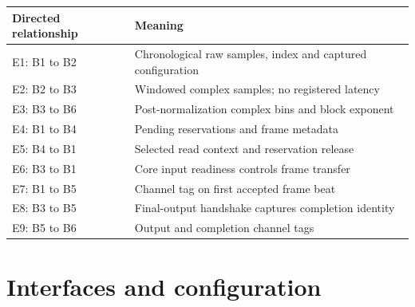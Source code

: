 \documentclass[11pt,a4paper]{article}
\begin{document}
{\small\renewcommand{\arraystretch}{1.18}\begin{longtable}{@{}L{0.24\textwidth}|L{0.7\textwidth}@{}}\toprule

\textbf{Directed relationship} & \textbf{Meaning}\\\midrule\endhead

E1: B1 to B2 & Chronological raw samples,\allowbreak{} index and captured configuration\\[2pt]\hline

E2: B2 to B3 & Windowed complex samples; no registered latency\\[2pt]\hline

E3: B3 to B6 & Post-normalization complex bins and block exponent\\[2pt]\hline

E4: B1 to B4 & Pending reservations and frame metadata\\[2pt]\hline

E5: B4 to B1 & Selected read context and reservation release\\[2pt]\hline

E6: B3 to B1 & Core input readiness controls frame transfer\\[2pt]\hline

E7: B1 to B5 & Channel tag on first accepted frame beat\\[2pt]\hline

E8: B3 to B5 & Final-output handshake captures completion identity\\[2pt]\hline

E9: B5 to B6 & Output and completion channel tags\\[2pt]\hline

\bottomrule\end{longtable}}

\section{Interfaces and configuration}
\end{document}
